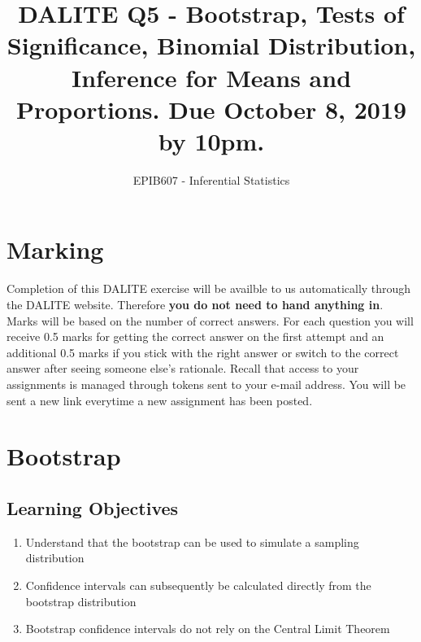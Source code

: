 \documentclass[letterpaper,10pt,twocolumn,twoside,printwatermark=false]{pinp}
\title{DALITE Q5 - Bootstrap, Tests of Significance, Binomial Distribution,
Inference for Means and Proportions. Due October 8, 2019 by 10pm.}
\author[a]{EPIB607 - Inferential Statistics}
\affil[a]{Fall 2019, McGill University}
\providecommand{\tightlist}{%
  \setlength{\itemsep}{0pt}\setlength{\parskip}{0pt}}
\begin{document}
\verticaladjustment{-2pt}

\maketitle
\thispagestyle{firststyle}



\hypertarget{marking}{%
\section*{Marking}\label{marking}}

Completion of this DALITE exercise will be availble to us automatically
through the DALITE website. Therefore \textbf{you do not need to hand
anything in}. Marks will be based on the number of correct answers. For
each question you will receive 0.5 marks for getting the correct answer
on the first attempt and an additional 0.5 marks if you stick with the
right answer or switch to the correct answer after seeing someone else's
rationale. Recall that access to your assignments is managed through
tokens sent to your e-mail address. You will be sent a new link
everytime a new assignment has been posted.

\hypertarget{bootstrap}{%
\section{Bootstrap}\label{bootstrap}}

\hypertarget{learning-objectives}{%
\subsection{Learning Objectives}\label{learning-objectives}}

\begin{enumerate}
\def\labelenumi{\arabic{enumi}.}
\tightlist
\item
  Understand that the bootstrap can be used to simulate a sampling
  distribution
\item
  Confidence intervals can subsequently be calculated directly from the
  bootstrap distribution
\item
  Bootstrap confidence intervals do not rely on the Central Limit
  Theorem
\end{enumerate}
\end{document}
